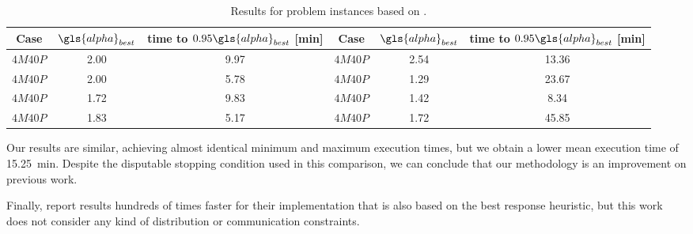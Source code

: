 \documentclass[main.tex]{subfiles}
\begin{document}
\begin{table}[hbtp]
    \centering
    \caption{Results for problem instances based on \textcite{al2012strictly}.}
    \label{tab:compare-al}
    \begin{tabular}{ccc|ccc}
        \toprule
        Case & $\gls{alpha}_{best}$ & time to $0.95\gls{alpha}_{best}$ [\si{\minute}] & Case & $\gls{alpha}_{best}$ & time to $0.95\gls{alpha}_{best}$ [\si{\minute}] \\
        \midrule
        $4M40P$ & \num{2.00} & \num{9.97} & $4M40P$ & \num{2.54} & \num{13.36} \\
        $4M40P$ & \num{2.00} & \num{5.78} & $4M40P$ & \num{1.29} & \num{23.67} \\
        $4M40P$ & \num{1.72} & \num{9.83} & $4M40P$ & \num{1.42} & \num{8.34}  \\
        $4M40P$ & \num{1.83} & \num{5.17} & $4M40P$ & \num{1.72} & \num{45.85} \\
        \bottomrule
    \end{tabular}
\end{table}

Our results are similar, achieving almost identical minimum and maximum execution times, but we obtain a lower mean execution time of \SI{15.25}{\minute}.
Despite the disputable stopping condition used in this comparison, we can conclude that our methodology is an improvement on previous work.

Finally, \textcite{pira2016line} report results hundreds of times faster for their implementation that is also based on the best response heuristic, but this work does not consider any kind of distribution or communication constraints.
\end{document}
